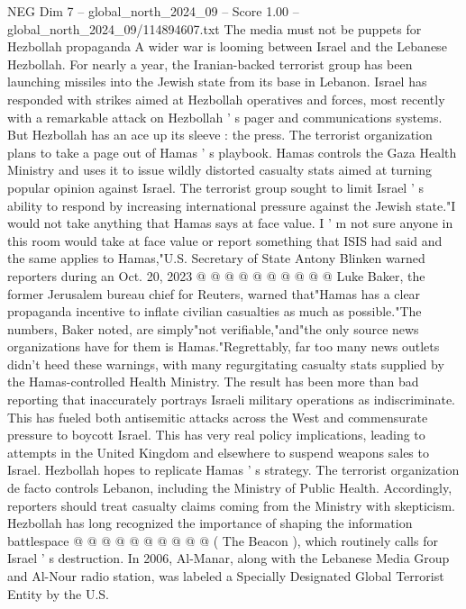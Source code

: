\begin{textsample}{NEG Dim 7 – global\_north\_2024\_09 – Score 1.00 – global\_north\_2024\_09/114894607.txt}  \label{ex:f7_neg_382}
The media must not be puppets for Hezbollah propaganda A wider war is looming between Israel and the Lebanese Hezbollah.
For nearly a year, the Iranian-backed terrorist group has been launching missiles into the Jewish state from its base in Lebanon.
Israel has responded with strikes aimed at Hezbollah operatives and forces, most recently with a remarkable attack on Hezbollah ' s pager and communications systems.
But Hezbollah has an ace up its sleeve : the press.
The terrorist organization plans to take a page out of Hamas ' s playbook.
Hamas controls the Gaza Health Ministry and uses it to issue wildly distorted casualty stats aimed at turning popular opinion against Israel.
The terrorist group sought to limit Israel ' s ability to respond by increasing international pressure against the Jewish state."I would not take anything that Hamas says at face value.
I ' m not sure anyone in this room would take at face value or report something that ISIS had said and the same applies to Hamas,"U.S.
Secretary of State Antony Blinken warned reporters during an Oct. 20, 2023 @ @ @ @ @ @ @ @ @ @ Luke Baker, the former Jerusalem bureau chief for Reuters, warned that"Hamas has a clear propaganda incentive to inflate civilian casualties as much as possible."The numbers, Baker noted, are simply"not verifiable,"and"the only source news organizations have for them is Hamas."Regrettably, far too many news outlets didn't heed these warnings, with many regurgitating casualty stats supplied by the Hamas-controlled Health Ministry.
The result has been more than bad reporting that inaccurately portrays Israeli military operations as indiscriminate.
This has fueled both antisemitic attacks across the West and commensurate pressure to boycott Israel.
This has very real policy implications, leading to attempts in the United Kingdom and elsewhere to suspend weapons sales to Israel.
Hezbollah hopes to replicate Hamas ' s strategy.
The terrorist organization de facto controls Lebanon, including the Ministry of Public Health.
Accordingly, reporters should treat casualty claims coming from the Ministry with skepticism.
Hezbollah has long recognized the importance of shaping the information battlespace @ @ @ @ @ @ @ @ @ @ ( The Beacon ), which routinely calls for Israel ' s destruction.
In 2006, Al-Manar, along with the Lebanese Media Group and Al-Nour radio station, was labeled a Specially Designated Global Terrorist Entity by the U.S.

\end{textsample}
